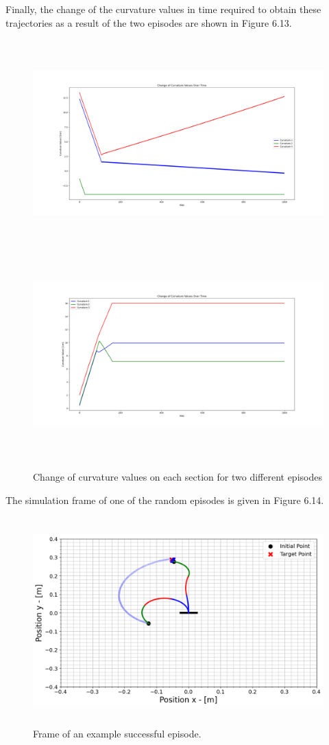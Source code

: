 \documentclass[12pt,twoside,a4]{mwbk}
\begin{document}
\noindent Finally, the change of the curvature values in time required to obtain these trajectories as a result of the two episodes are shown in Figure 6.13.
\newpage
\begin{figure}[h!]
    \centering
    \includegraphics[width=16cm, height=8cm]{curvature_values_2.png}
    \includegraphics[width=16cm, height=8cm]{curvature_values_3.png}
    \caption{Change of curvature values on each section for two different episodes}
\end{figure}

\noindent The simulation frame of one of the random episodes is given in Figure 6.14.
\newpage
\begin{figure}[h!]
    \centering
    \includegraphics[width=16cm, height=8cm]{target_arrived.png}
    \caption{Frame of an example successful episode.}
\end{figure}
\end{document}
